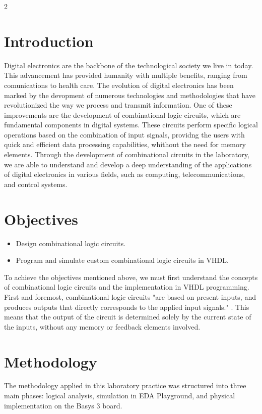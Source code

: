 \documentclass{article}
\begin{document}
\begin{multicols}{2} %
\section{Introduction}\label{Intro}  
Digital electronics are the backbone of the technological society we live in today. This advancement has provided humanity with multiple benefits,
ranging from comunications to health care. The evolution of digital electronics has been marked by the devopment of numerous technologies
and methodologies that have revolutionized the way we process and transmit information. One of these improvements are the development of 
combinational logic circuits, which are fundamental components in digital systems. These circuits perform specific logical operations based on the combination of input signals,
providng the users with quick and efficient data processing capabilities, whithout the need for memory elements. Through the development of 
combinational circuits in the laboratory, we are able to understand and develop a deep understanding of the applications of digital electronics in various fields, such as computing, telecommunications, and control systems.

\section{Objectives}\label{Objectives}  
\begin{itemize}
  \item Design combinational logic circuits.
  \item Program and simulate custom combinational logic circuits in VHDL.
\end{itemize}
To achieve the objectives mentioned above, we must first understand the concepts of combinational logic circuits and the implementation in VHDL programming.
First and foremost, combinational logic circuits "are based on present inputs, and produces outputs that directly corresponds to the applied input signals." \cite{Joseph2025Hardware}. 
This means that the output of the circuit is determined solely by the current state of the inputs, without any memory or feedback elements involved.

\section{Methodology}\label{Meth}
The methodology applied in this laboratory practice was structured into three main phases: logical analysis, simulation in EDA Playground, and physical implementation on the Basys 3 board.


\end{multicols}
\end{document}
